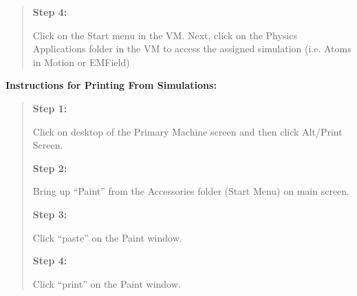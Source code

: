 \begin{quote}
\medskip\textbf{Step 4:}

Click on the Start menu in the VM.  Next, click on the Physics Applications folder in the VM to access the assigned simulation (i.e. Atoms in Motion or EMField)

\end{quote}

\bigskip\textbf{Instructions for Printing From Simulations:}

\begin{quote}
\textbf{Step 1:}
 
Click on desktop of the Primary Machine screen and then click Alt/Print Screen.  

\medskip\textbf{Step 2:}
 
Bring up ``Paint'' from the Accessories folder (Start Menu) on main screen.

\medskip\textbf{Step 3:}
 
Click ``paste'' on the Paint window.

\medskip\textbf{Step 4:}
 
Click ``print'' on the Paint window.
\end{quote}


